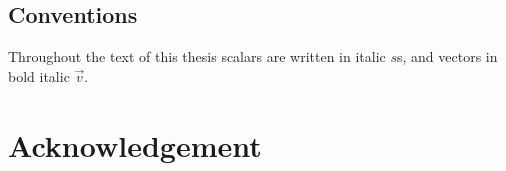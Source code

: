 \documentclass[
    a4paper,
    11pt,
    DIV=calc,
    numbers=noenddot,
    headsepline=0.04em,
    headinclude,
    BCOR=6mm,
    titlepage=firstiscover,
]{scrbook}
\begin{document}


\frontmatter

\listoftodos
\clearpage



\hypersetup{hidelinks}
\tableofcontents
\clearpage

\printglossaries



\section*{Conventions}
Throughout the text of this thesis scalars are written in italic \(s\)s, and vectors in bold italic \(\vec{v}\).
\newpage
\nonfrenchspacing

\mainmatter
\renewcommand{\thechapter}{\Roman{chapter}}



\cleardoublepage
{}
{}
\printbibliography

\backmatter


\chapter*{Acknowledgement}


%
\end{document}
